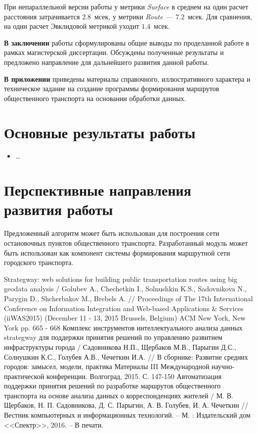 При непараллельной версии работы у метрики \emph{Surface} в среднем на один расчет расстояния затрачивается \( 2.8 \)~мсек, у метрики \emph{Route}~--- \( 7.2 \)~мсек. Для сравнения, на один расчет Эвклидовой метрикой уходит \( 1.4 \)~мсек.

\textbf{В заключении} работы сформулированы общие выводы по проделанной работе в рамках магистерской диссертации. Обсуждены полученные результаты и предложено направление для дальнейшего развития данной работы.

\textbf{В приложении} приведены материалы справочного, иллюстративного характера и техническое задание на создание программы формирования маршрутов общественного транспорта на основании обработки данных.

\section{Основные результаты работы}
\begin{itemize}
    \item \ldots
\end{itemize}

\section{Перспективные направления развития работы}
Предложенный алгоритм может быть использован для построения сети остановочных пунктов общественного транспорта.
Разработанный модуль может быть использован как компонент системы формирования маршрутной сети городского транспорта.

\renewcommand{\bibname}{Публикации по теме диссертации}
\begin{thebibliography}{10}
     Strategway: web solutions for building public transportation routes using big geodata 
        analysis / Golubev A., Chechetkin I., Solnushkin K.S., Sadovnikova N., Parygin D., Shcherbakov M., 
        Brebels A. // Proceedings of The 17th International Conference on Information Integration and 
        Web-based Applications \& Services (iiWAS2015) (December 11 - 13, 2015 Brussels, Belgium) 
        ACM New York, New York pp. 665 - 668
     Комплекс инструментов интеллектуального анализа данных strategway для поддержки 
        принятия решений по управлению развитием инфраструктуры города / Садовникова Н.П., Щербаков М.В., 
        Парыгин Д.С., Солнушкин К.С., Голубев А.В., Чечеткин И.А. // В сборнике: Развитие средних 
        городов: замысел, модели, практика Материалы III Международной научно-практической конференции. 
        Волгоград, 2015. С. 147-150
     Автоматизация поддержки принятия решений по разработке маршрутов общественного 
        транспорта на основе анализа данных о корреспонденциях жителей / М. В. Щербаков, 
        Н. П. Садовникова, Д. С. Парыгин, А. В. Голубев, И. А. Чечеткин // Вестник компьютерных и 
        информационных технологий. -- М. : Издательский дом <<Спектр>>, 2016. -- В печати.
\end{thebibliography}